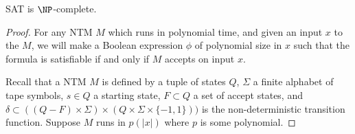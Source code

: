 \documentclass[runningheads,a4paper]{llncs}
\begin{document}
\begin{theorem}
\label{thm:cooklevin}
SAT is $\NP$-complete.
\end{theorem}

\begin{proof}
For any NTM $M$ which runs in polynomial time, and given an input $x$ to the $M$, we will make a Boolean expression $\phi$ of polynomial size in $x$ such that the formula is satisfiable if and only if $M$ accepts on input $x$. 

Recall that a NTM $M$ is defined by a tuple of states $Q$, $\Sigma$ a finite alphabet of tape symbols, $s \in Q$ a starting state, $F \subset Q$ a set of accept states, and $\delta \subset ((Q - F) \times \Sigma) \times (Q \times \Sigma \times \{ -1, 1\}))$ is the non-deterministic transition function. Suppose $M$ runs in $p(|x|)$ where $p$ is some polynomial.


\end{proof}
\end{document}

